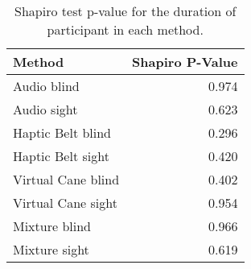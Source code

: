 
\begin{table}[!htb]
\centering
\caption{Shapiro test p-value for the duration of participant in each method.}
\label{tab:shapiro_duration}
\begin{tabular}{lr}
\toprule
            Method &  Shapiro P-Value \\
\midrule
       Audio blind &            0.974 \\
       Audio sight &            0.623 \\
 Haptic Belt blind &            0.296 \\
 Haptic Belt sight &            0.420 \\
Virtual Cane blind &            0.402 \\
Virtual Cane sight &            0.954 \\
     Mixture blind &            0.966 \\
     Mixture sight &            0.619 \\
\bottomrule
\end{tabular}
\end{table}

